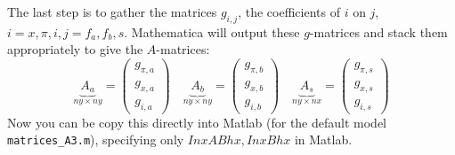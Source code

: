 \documentclass[11pt]{article}
\renewcommand{\[}{\begin{equation}}
\renewcommand{\]}{\end{equation}}
\begin{document}
The last step is to gather the matrices $g_{i,j}$, the coefficients of $i$ on $j$, $i=x,\pi,i, j=f_a,f_b,s$. Mathematica will output these $g$-matrices and stack them appropriately to give the $A$-matrices:
\begin{equation}
\underbrace{A_a}_{ny \times ny} = \begin{pmatrix} g_{\pi,a} \\ g_{x,a} \\ g_{i,a}\end{pmatrix} \quad 
\underbrace{A_b}_{ny \times ny} = \begin{pmatrix} g_{\pi,b} \\ g_{x,b} \\ g_{i,b}\end{pmatrix} \quad 
\underbrace{A_s}_{ny \times nx} = \begin{pmatrix} g_{\pi,s} \\ g_{x,s} \\ g_{i,s}\end{pmatrix}
\end{equation} 
Now you can be copy this directly into Matlab (for the default model \texttt{matrices\_A3.m}), specifying only $InxABhx, InxBhx$ in Matlab.
\end{document}
